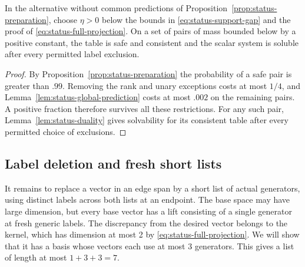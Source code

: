 \begin{lemma}\label{lem:status-span}
In the alternative without common predictions of
Proposition~\ref{prop:status-preparation}, choose \(\eta>0\) below the
bounds in \eqref{eq:status-support-gap} and the proof of
\eqref{eq:status-full-projection}. On a set of pairs of mass bounded
below by a positive constant, the table is safe and consistent and
the scalar system is soluble after every permitted label exclusion.

\end{lemma}
\begin{proof}
By Proposition~\ref{prop:status-preparation} the probability of a
safe pair is greater than \(.99\). Removing the rank and unary exceptions
costs at most \(1/4\), and Lemma~\ref{lem:status-global-prediction}
costs at most \(.002\) on the remaining pairs. A positive fraction
therefore survives all these restrictions. For any such pair,
Lemma~\ref{lem:status-duality} gives solvability for its consistent
table after every permitted choice of exclusions.

\end{proof}

\subsection{Label deletion and fresh short lists}

It remains to replace a vector in an edge span by a short list of actual
generators, using distinct labels across both lists at an endpoint.
The base space may have large dimension, but every base vector has a
lift consisting of a single generator at fresh generic labels.
The discrepancy from the desired vector belongs to the kernel, which
has dimension at most 2 by \eqref{eq:status-full-projection}. We will
show that it has a basis whose vectors each use at most 3 generators.
This gives a list of length at most \(1+3+3=7\).

